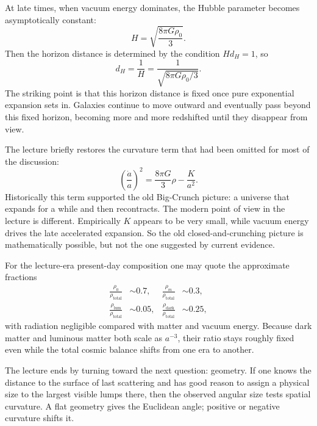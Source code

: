 At late times, when vacuum energy dominates, the Hubble parameter becomes asymptotically constant:
\begin{equation}
H=\sqrt{\frac{8\pi G\rho_0}{3}}.
\end{equation}
Then the horizon distance is determined by the condition \(Hd_H=1\), so
\begin{equation}
d_H=\frac{1}{H}=\frac{1}{\sqrt{8\pi G\rho_0/3}}.
\end{equation}
The striking point is that this horizon distance is fixed once pure exponential expansion sets in. Galaxies continue to move outward and eventually pass beyond this fixed horizon, becoming more and more redshifted until they disappear from view.

The lecture briefly restores the curvature term that had been omitted for most of the discussion:
\begin{equation}
\left(\frac{\dot a}{a}\right)^2
=
\frac{8\pi G}{3}\rho
-
\frac{K}{a^2}.
\end{equation}
Historically this term supported the old Big-Crunch picture: a universe that expands for a while and then recontracts. The modern point of view in the lecture is different. Empirically \(K\) appears to be very small, while vacuum energy drives the late accelerated expansion. So the old closed-and-crunching picture is mathematically possible, but not the one suggested by current evidence.

For the lecture-era present-day composition one may quote the approximate fractions
\begin{align}
\frac{\rho_0}{\rho_{\text{total}}} &\sim 0.7,
&
\frac{\rho_m}{\rho_{\text{total}}} &\sim 0.3,
\\
\frac{\rho_{\text{lum}}}{\rho_{\text{total}}} &\sim 0.05,
&
\frac{\rho_{\text{dark}}}{\rho_{\text{total}}} &\sim 0.25,
\end{align}
with radiation negligible compared with matter and vacuum energy. Because dark matter and luminous matter both scale as \(a^{-3}\), their ratio stays roughly fixed even while the total cosmic balance shifts from one era to another.

The lecture ends by turning toward the next question: geometry. If one knows the distance to the surface of last scattering and has good reason to assign a physical size to the largest visible lumps there, then the observed angular size tests spatial curvature. A flat geometry gives the Euclidean angle; positive or negative curvature shifts it.


